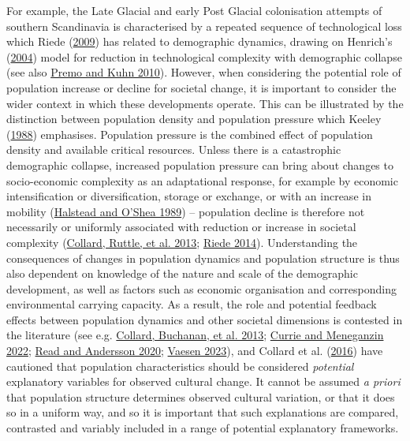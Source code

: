 \documentclass[
  12pt,
  a4paper,
  oneside]{book}
\begin{document}
For example, the Late Glacial and early Post Glacial colonisation attempts of southern Scandinavia is characterised by a repeated sequence of technological loss which Riede (\protect\hyperlink{ref-riede2009}{2009}) has related to demographic dynamics, drawing on Henrich's (\protect\hyperlink{ref-henrich2004}{2004}) model for reduction in technological complexity with demographic collapse (see also \protect\hyperlink{ref-premo2010a}{Premo and Kuhn 2010}). However, when considering the potential role of population increase or decline for societal change, it is important to consider the wider context in which these developments operate. This can be illustrated by the distinction between population density and population pressure which Keeley (\protect\hyperlink{ref-keeley1988}{1988}) emphasises. Population pressure is the combined effect of population density and available critical resources. Unless there is a catastrophic demographic collapse, increased population pressure can bring about changes to socio-economic complexity as an adaptational response, for example by economic intensification or diversification, storage or exchange, or with an increase in mobility (\protect\hyperlink{ref-halstead1989}{Halstead and O'Shea 1989}) -- population decline is therefore not necessarily or uniformly associated with reduction or increase in societal complexity (\protect\hyperlink{ref-collard2013a}{Collard, Ruttle, et al. 2013}; \protect\hyperlink{ref-riede2014}{Riede 2014}). Understanding the consequences of changes in population dynamics and population structure is thus also dependent on knowledge of the nature and scale of the demographic development, as well as factors such as economic organisation and corresponding environmental carrying capacity. As a result, the role and potential feedback effects between population dynamics and other societal dimensions is contested in the literature (see e.g. \protect\hyperlink{ref-collard2013b}{Collard, Buchanan, et al. 2013}; \protect\hyperlink{ref-currie2022}{Currie and Meneganzin 2022}; \protect\hyperlink{ref-read2020}{Read and Andersson 2020}; \protect\hyperlink{ref-vaesen2023}{Vaesen 2023}), and Collard et al. (\protect\hyperlink{ref-collard2016}{2016}) have cautioned that population characteristics should be considered \emph{potential} explanatory variables for observed cultural change. It cannot be assumed \emph{a priori} that population structure determines observed cultural variation, or that it does so in a uniform way, and so it is important that such explanations are compared, contrasted and variably included in a range of potential explanatory frameworks.
\end{document}
